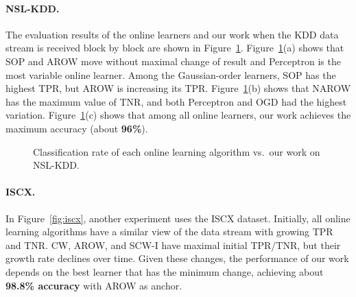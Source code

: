 \documentclass[12pt,a4paper]{article}
\begin{document}
	\paragraph{NSL-KDD.} The evaluation results of the online learners and our work when the KDD data stream is received block by block are shown in Figure~\ref{fig:nsl_kdd}. Figure~\ref{fig:nsl_kdd}(a) shows that SOP and AROW move without maximal change of result and Perceptron is the most variable online learner. Among the Gaussian-order learners, SOP has the highest TPR, but AROW is increasing its TPR. Figure~\ref{fig:nsl_kdd}(b) shows that NAROW has the maximum value of TNR, and both Perceptron and OGD had the highest variation. Figure~\ref{fig:nsl_kdd}(c) shows that among all online learners, our work achieves the maximum accuracy (about \textbf{96\%}).
	
	\begin{figure}[H]
		\centering
		\caption{Classification rate of each online learning algorithm vs.\ our work on NSL-KDD.}
		\label{fig:nsl_kdd}
	\end{figure}
	
	\paragraph{ISCX.} In Figure~\ref{fig:iscx}, another experiment uses the ISCX dataset. Initially, all online learning algorithms have a similar view of the data stream with growing TPR and TNR. CW, AROW, and SCW-I have maximal initial TPR/TNR, but their growth rate declines over time. Given these changes, the performance of our work depends on the best learner that has the minimum change, achieving about \textbf{98.8\% accuracy} with AROW as anchor.
	
\end{document}
